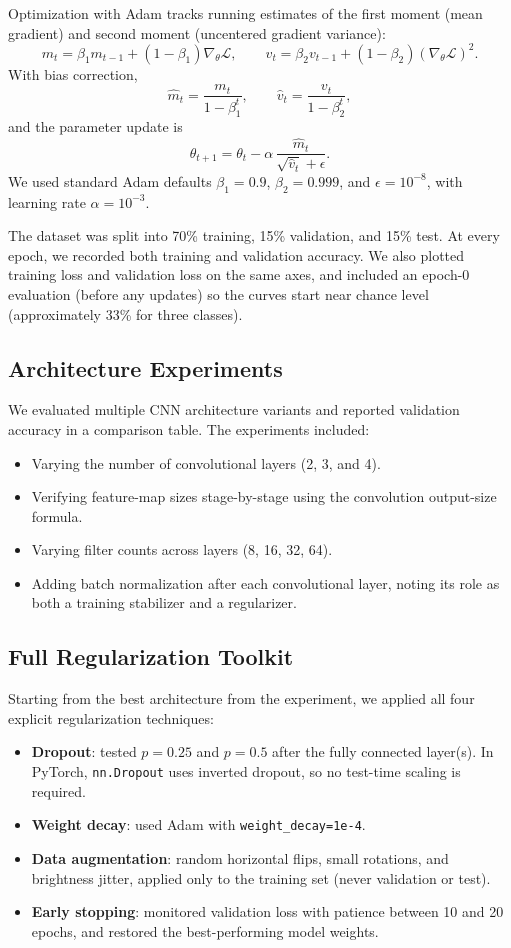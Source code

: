 \documentclass[10pt,twocolumn]{article}
\begin{document}
Optimization with Adam tracks running estimates of the first moment (mean gradient) and second moment (uncentered gradient variance):
\[
m_t = \beta_1 m_{t-1} + (1-\beta_1)\nabla_\theta \mathcal{L},
\qquad
v_t = \beta_2 v_{t-1} + (1-\beta_2)(\nabla_\theta \mathcal{L})^2.
\]
With bias correction,
\[
\hat{m}_t = \frac{m_t}{1-\beta_1^t},
\qquad
\hat{v}_t = \frac{v_t}{1-\beta_2^t},
\]
and the parameter update is
\[
\theta_{t+1} = \theta_t - \alpha\,\frac{\hat{m}_t}{\sqrt{\hat{v}_t}+\epsilon}.
\]
We used standard Adam defaults $\beta_1=0.9$, $\beta_2=0.999$, and $\epsilon=10^{-8}$, with learning rate $\alpha=10^{-3}$.

The dataset was split into 70\% training, 15\% validation, and 15\% test. At every epoch, we recorded both training and validation accuracy. We also plotted training loss and validation loss on the same axes, and included an epoch-0 evaluation (before any updates) so the curves start near chance level (approximately 33\% for three classes).

\subsection{Architecture Experiments}
We evaluated multiple CNN architecture variants and reported validation accuracy in a comparison table. The experiments included:

\begin{itemize}
	\item Varying the number of convolutional layers (2, 3, and 4).
	\item Verifying feature-map sizes stage-by-stage using the convolution output-size formula.
	\item Varying filter counts across layers (8, 16, 32, 64).
	\item Adding batch normalization after each convolutional layer, noting its role as both a training stabilizer and a regularizer.
\end{itemize}

\subsection{Full Regularization Toolkit}
Starting from the best architecture from the experiment, we applied all four explicit regularization techniques:

\begin{itemize}
	\item \textbf{Dropout}: tested \(p=0.25\) and \(p=0.5\) after the fully connected layer(s). In PyTorch, \texttt{nn.Dropout} uses inverted dropout, so no test-time scaling is required.
	\item \textbf{Weight decay}: used Adam with \texttt{weight\_decay=1e-4}.
	\item \textbf{Data augmentation}: random horizontal flips, small rotations, and brightness jitter, applied only to the training set (never validation or test).
	\item \textbf{Early stopping}: monitored validation loss with patience between 10 and 20 epochs, and restored the best-performing model weights.
\end{itemize}
\end{document}

